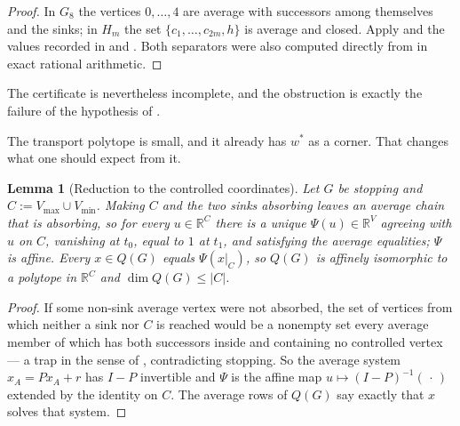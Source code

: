 \documentclass[11pt]{article}
\theoremstyle{plain}
\newtheorem{lemma}[theorem]{Lemma}
\theoremstyle{definition}
\newcommand{\Vmax}{V_{\max}}
\newcommand{\Vmin}{V_{\min}}
\begin{document}
\begin{proof}
In $G_8$ the vertices $0,\dots,4$ are average with successors among
themselves and the sinks; in $H_m$ the set
$\{c_1,\dots,c_{2m},h\}$ is average and closed. Apply
 and the values recorded in
 and . Both separators were
also computed directly from  in exact rational
arithmetic.
\end{proof}

The certificate is nevertheless incomplete, and the obstruction is
exactly the failure of the hypothesis of .

The transport polytope is small, and it already has $w^\ast$ as a corner. That
changes what one should expect from it.

\begin{lemma}[Reduction to the controlled coordinates]\label{lem:transport-dim}
Let $G$ be stopping and $C:=\Vmax\cup\Vmin$. Making $C$ and the two sinks
absorbing leaves an average chain that is absorbing, so for every
$u\in\mathbb R^{C}$ there is a unique $\Psi(u)\in\mathbb R^{V}$ agreeing with
$u$ on $C$, vanishing at $t_0$, equal to $1$ at $t_1$, and satisfying the
average equalities; $\Psi$ is affine. Every $x\in Q(G)$ equals
$\Psi(x|_{C})$, so $Q(G)$ is affinely isomorphic to a polytope in
$\mathbb R^{C}$ and $\dim Q(G)\le|C|$.
\end{lemma}

\begin{proof}
If some non-sink average vertex were not absorbed, the set of vertices from
which neither a sink nor $C$ is reached would be a nonempty set every average
member of which has both successors inside and containing no controlled vertex
--- a trap in the sense of , contradicting stopping. So the
average system $x_A=Px_A+r$ has $I-P$ invertible and $\Psi$ is the affine map
$u\mapsto(I-P)^{-1}(\,\cdot\,)$ extended by the identity on $C$. The average
rows of $Q(G)$ say exactly that $x$ solves that system.
\end{proof}
\end{document}
